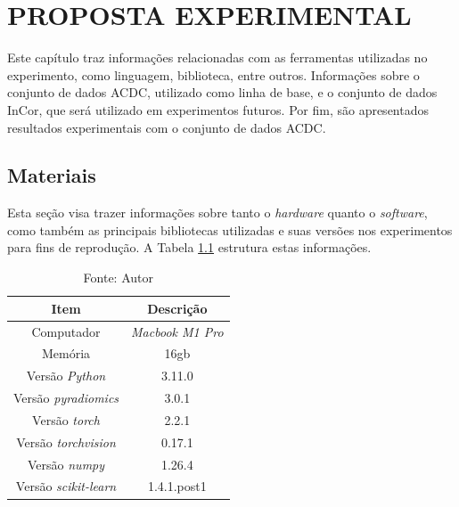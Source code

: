 \chapter{PROPOSTA EXPERIMENTAL}
\label{chap:proposta_experimental}

Este capítulo traz informações relacionadas com as ferramentas utilizadas no experimento, como linguagem, biblioteca, entre outros. Informações sobre o conjunto de dados \gls{ACDC}, utilizado como linha de base, e o conjunto de dados \gls{InCor}, que será utilizado em experimentos futuros. Por fim, são apresentados resultados experimentais com o conjunto de dados \gls{ACDC}. 

\section{Materiais} 
\label{sec:cap5_materiais}

Esta seção visa trazer informações sobre tanto o \textit{hardware} quanto o \textit{software}, como também as principais bibliotecas utilizadas e suas versões nos experimentos para fins de reprodução. A Tabela \ref{tab:hardware_software} estrutura estas informações.

\begin{table}[hbtp]
    \centering
    \renewcommand{\arraystretch}{1} %
    \begin{tabular}{|c|c|}
    \hline 
       \textbf{Item} & \textbf{Descrição}\\
    \hline 
       Computador & \textit{Macbook M1 Pro}  \\
    \hline 
       Memória & 16gb  \\
    \hline 
       Versão \textit{Python} & 3.11.0  \\
    \hline 
       Versão \textit{pyradiomics} & 3.0.1 \\
    \hline 
       Versão \textit{torch} & 2.2.1 \\
    \hline 
       Versão \textit{torchvision} & 0.17.1 \\
    \hline 
       Versão \textit{numpy} & 1.26.4 \\
    \hline 
       Versão \textit{scikit-learn} & 1.4.1.post1 \\
    \hline 
    \end{tabular} 
    \caption{Fonte: Autor}
    \label{tab:hardware_software}
\end{table}

